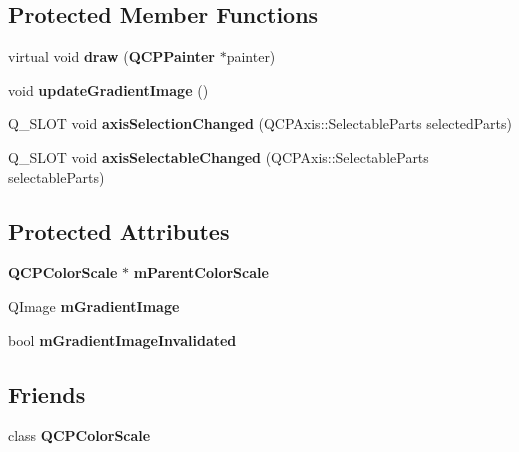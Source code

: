 \subsection*{Protected Member Functions}
\begin{DoxyCompactItemize}
\item 
virtual void {\bfseries draw} ({\bf Q\+C\+P\+Painter} $\ast$painter)\label{class_q_c_p_color_scale_axis_rect_private_adb67bfe9057a9dd9a85f548c274e6d98}

\item 
void {\bfseries update\+Gradient\+Image} ()\label{class_q_c_p_color_scale_axis_rect_private_a73754cab312aeaddea1bfcc67cc079ac}

\item 
Q\+\_\+\+S\+L\+O\+T void {\bfseries axis\+Selection\+Changed} (Q\+C\+P\+Axis\+::\+Selectable\+Parts selected\+Parts)\label{class_q_c_p_color_scale_axis_rect_private_a6112ad4291ac1695d37659cb049d598d}

\item 
Q\+\_\+\+S\+L\+O\+T void {\bfseries axis\+Selectable\+Changed} (Q\+C\+P\+Axis\+::\+Selectable\+Parts selectable\+Parts)\label{class_q_c_p_color_scale_axis_rect_private_a66d2baed86966bb03a6d7c32dc7d59f7}

\end{DoxyCompactItemize}
\subsection*{Protected Attributes}
\begin{DoxyCompactItemize}
\item 
{\bf Q\+C\+P\+Color\+Scale} $\ast$ {\bfseries m\+Parent\+Color\+Scale}\label{class_q_c_p_color_scale_axis_rect_private_a311c73f51a4cb0b556388197833cf099}

\item 
Q\+Image {\bfseries m\+Gradient\+Image}\label{class_q_c_p_color_scale_axis_rect_private_ad4f7c8ee1c6012d9950870811773119c}

\item 
bool {\bfseries m\+Gradient\+Image\+Invalidated}\label{class_q_c_p_color_scale_axis_rect_private_a2c0b15b071e1f93006b48b5be022a631}

\end{DoxyCompactItemize}
\subsection*{Friends}
\begin{DoxyCompactItemize}
\item 
class {\bfseries Q\+C\+P\+Color\+Scale}\label{class_q_c_p_color_scale_axis_rect_private_a60f6031408a325ebd1bbbad1ccf9b897}

\end{DoxyCompactItemize}
